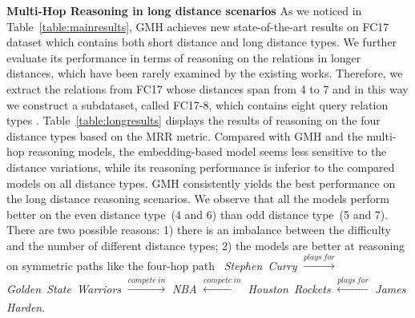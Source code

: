



% 

\noindent
\textbf{Multi-Hop Reasoning in long distance scenarios}
As we noticed in Table~\ref{table:mainresults}, GMH %
achieves new state-of-the-art results 
on FC17 %
dataset which contains both short distance and long distance types.
We further evaluate its performance in terms of reasoning on the relations in 
longer distances,
which have been rarely examined by the existing works.
Therefore, we extract the relations from FC17 whose distances span from 4 to 7 and in this way we construct a subdataset, called FC17-8, which
contains eight query relation types
. %
Table~\ref{table:longresults} displays the results of reasoning on the four distance types based on the MRR metric.
Compared with GMH and the multi-hop reasoning models, the embedding-based model seems less sensitive to the distance variations, %
while its reasoning performance is inferior to %
the compared models on all distance types. 
GMH consistently yields the best performance on the long distance reasoning scenarios.
We observe that all the models perform better on the even distance type~(4 and 6) than odd distance type~(5 and 7).
There are two possible reasons:
1) there is an imbalance between the difficulty and the number of different distance types;
2) the models are better at reasoning on symmetric paths like the four-hop path~
\textit{Stephen~Curry}
$\xrightarrow[]{plays~for}$
\textit{Golden~State~Warriors}
$\xrightarrow[]{compete~in}$
\textit{NBA}
$\xleftarrow[]{compete~in}$
\textit{Houston~Rockets}
$\xleftarrow[]{plays~for}$
\textit{James Harden}.



